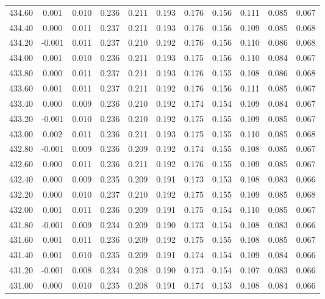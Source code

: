 \begin{longtable}{cccccccccc}
    434.60 &  0.001 &  0.010 &  0.236 &  0.211 &  0.193 &  0.176 &  0.156 &  0.111 &  0.085 &  0.067 \\
    434.40 &  0.000 &  0.011 &  0.237 &  0.211 &  0.193 &  0.176 &  0.156 &  0.109 &  0.085 &  0.068 \\
    434.20 & -0.001 &  0.011 &  0.237 &  0.210 &  0.192 &  0.176 &  0.156 &  0.110 &  0.086 &  0.068 \\
    434.00 &  0.001 &  0.010 &  0.236 &  0.211 &  0.193 &  0.175 &  0.156 &  0.110 &  0.084 &  0.067 \\
    433.80 &  0.000 &  0.011 &  0.237 &  0.211 &  0.193 &  0.176 &  0.155 &  0.108 &  0.086 &  0.068 \\
    433.60 &  0.001 &  0.011 &  0.237 &  0.211 &  0.192 &  0.176 &  0.156 &  0.111 &  0.085 &  0.067 \\
    433.40 &  0.000 &  0.009 &  0.236 &  0.210 &  0.192 &  0.174 &  0.154 &  0.109 &  0.084 &  0.067 \\
    433.20 & -0.001 &  0.010 &  0.236 &  0.210 &  0.192 &  0.175 &  0.155 &  0.109 &  0.085 &  0.067 \\
    433.00 &  0.002 &  0.011 &  0.236 &  0.211 &  0.193 &  0.175 &  0.155 &  0.110 &  0.085 &  0.068 \\
    432.80 & -0.001 &  0.009 &  0.236 &  0.209 &  0.192 &  0.174 &  0.155 &  0.108 &  0.085 &  0.067 \\
    432.60 &  0.000 &  0.011 &  0.236 &  0.211 &  0.192 &  0.176 &  0.155 &  0.109 &  0.085 &  0.067 \\
    432.40 &  0.000 &  0.009 &  0.235 &  0.209 &  0.191 &  0.173 &  0.153 &  0.108 &  0.083 &  0.066 \\
    432.20 &  0.000 &  0.010 &  0.237 &  0.210 &  0.192 &  0.175 &  0.155 &  0.109 &  0.085 &  0.068 \\
    432.00 &  0.001 &  0.011 &  0.236 &  0.209 &  0.191 &  0.175 &  0.154 &  0.110 &  0.085 &  0.067 \\
    431.80 & -0.001 &  0.009 &  0.234 &  0.209 &  0.190 &  0.173 &  0.154 &  0.108 &  0.083 &  0.066 \\
    431.60 &  0.001 &  0.011 &  0.236 &  0.209 &  0.192 &  0.175 &  0.155 &  0.108 &  0.085 &  0.067 \\
    431.40 &  0.001 &  0.010 &  0.235 &  0.209 &  0.191 &  0.174 &  0.154 &  0.109 &  0.084 &  0.066 \\
    431.20 & -0.001 &  0.008 &  0.234 &  0.208 &  0.190 &  0.173 &  0.154 &  0.107 &  0.083 &  0.066 \\
    431.00 &  0.000 &  0.010 &  0.235 &  0.208 &  0.191 &  0.174 &  0.153 &  0.108 &  0.084 &  0.066 \\

\end{longtable}
